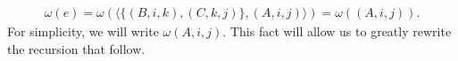   \begin{align}
    \omega(e) = \omega(\langle \{ (B, i, k), (C, k, j) \},  (A, i, j) \rangle) = \omega((A, i, j)).
  \end{align}
  For simplicity, we will write $\omega(A,i,j)$. This fact will allow us to greatly rewrite the recursion that follow.

%
%
%
